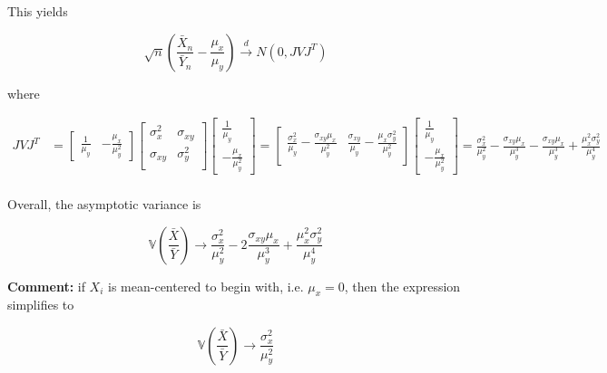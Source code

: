 \documentclass{article}
\newcommand{\Var}{\mathbb{V}}
\theoremstyle{definition}
\begin{document}
This yields

\begin{equation*}
\sqrt{n}\left(\frac{\bar{X}_n}{\bar{Y}_n} - \frac{\mu_x}{\mu_y}\right) \xrightarrow{d} N(0, JVJ^T)
\end{equation*}

where


\begin{align*}
    JVJ^T &= \begin{bmatrix}
\frac{1}{\mu_y} &  -\frac{\mu_x}{\mu_y^2}
\end{bmatrix} 
\begin{bmatrix}
    \sigma_x^2   &  \sigma_{xy}\\
    \sigma_{xy} & \sigma_y^2  \\
\end{bmatrix}
\begin{bmatrix}
\frac{1}{\mu_y} \\ -\frac{\mu_x}{\mu_y^2}
\end{bmatrix} =\begin{bmatrix}
  \frac{\sigma_x^2}{\mu_y} - \frac{\sigma_{xy}\mu_x}{\mu_y^2}  & \frac{\sigma_{xy}}{\mu_y} - \frac{\mu_x\sigma_{y}^2}{\mu_y^2} \\
\end{bmatrix}
\begin{bmatrix}
\frac{1}{\mu_y} \\ -\frac{\mu_x}{\mu_y^2}
\end{bmatrix} =
  \frac{\sigma_x^2}{\mu_y^2} - \frac{\sigma_{xy}\mu_x}{\mu_y^3}  - \frac{\sigma_{xy}\mu_x}{\mu_y^3} + \frac{\mu_x^2\sigma_{y}^2}{\mu_y^4} \\
\end{align*}

Overall, the asymptotic variance is

\begin{equation}\label{eq-ratiovar}
  \Var\left(\frac{\bar{X}}{\bar{Y}}\right)\rightarrow  \frac{\sigma_x^2}{\mu_y^2} - 2\frac{\sigma_{xy}\mu_x}{\mu_y^3}  + \frac{\mu_x^2\sigma_{y}^2}{\mu_y^4}
\end{equation}

\textbf{Comment:} if $X_i$ is mean-centered to begin with, i.e. $\mu_x=0$, then the expression simplifies to

\begin{equation}\label{eq-ratiovar}
  \Var\left(\frac{\bar{X}}{\bar{Y}}\right)\rightarrow  \frac{\sigma_x^2}{\mu_y^2}
\end{equation}
\end{document}
